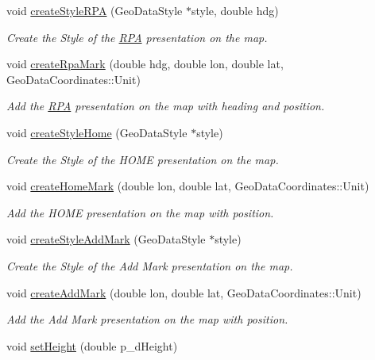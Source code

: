 \begin{DoxyCompactItemize}
void \hyperlink{class_m_a_r_c_s_a2ca31f389f0705fa83c5857600bbd038}{create\-Style\-R\-P\-A} (Geo\-Data\-Style $\ast$style, double hdg)
\begin{DoxyCompactList}\small\item\em Create the Style of the \hyperlink{class_r_p_a}{R\-P\-A} presentation on the map. \end{DoxyCompactList}\item 
void \hyperlink{class_m_a_r_c_s_a2ca454ceef4f8807c68857c64779a60a}{create\-Rpa\-Mark} (double hdg, double lon, double lat, Geo\-Data\-Coordinates\-::\-Unit)
\begin{DoxyCompactList}\small\item\em Add the \hyperlink{class_r_p_a}{R\-P\-A} presentation on the map with heading and position. \end{DoxyCompactList}\item 
void \hyperlink{class_m_a_r_c_s_a204762373810091bd4aea0dda9f5651b}{create\-Style\-Home} (Geo\-Data\-Style $\ast$style)
\begin{DoxyCompactList}\small\item\em Create the Style of the H\-O\-M\-E presentation on the map. \end{DoxyCompactList}\item 
void \hyperlink{class_m_a_r_c_s_a9e57797483c62bb448483948a307a288}{create\-Home\-Mark} (double lon, double lat, Geo\-Data\-Coordinates\-::\-Unit)
\begin{DoxyCompactList}\small\item\em Add the H\-O\-M\-E presentation on the map with position. \end{DoxyCompactList}\item 
void \hyperlink{class_m_a_r_c_s_ae05982a51a934059304bf19de385b3df}{create\-Style\-Add\-Mark} (Geo\-Data\-Style $\ast$style)
\begin{DoxyCompactList}\small\item\em Create the Style of the Add Mark presentation on the map. \end{DoxyCompactList}\item 
void \hyperlink{class_m_a_r_c_s_af7890fb86b7f05e21cb609eb4c78a7ab}{create\-Add\-Mark} (double lon, double lat, Geo\-Data\-Coordinates\-::\-Unit)
\begin{DoxyCompactList}\small\item\em Add the Add Mark presentation on the map with position. \end{DoxyCompactList}\item 
void \hyperlink{class_m_a_r_c_s_ae772616ba5526766bce4a106831ca5be}{set\-Height} (double p\-\_\-d\-Height)

\end{DoxyCompactItemize}

